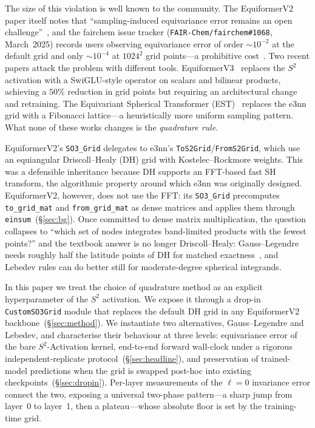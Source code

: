 \documentclass{article}
\begin{document}
The size of this violation is well known to the community. The
EquiformerV2 paper itself notes that ``sampling-induced equivariance
error remains an open challenge''~\cite{equiformerv2}, and the fairchem
issue tracker (\texttt{FAIR-Chem/fairchem\#1068}, March~2025) records
users observing equivariance error of order $\sim 10^{-2}$ at the
default grid and only $\sim 10^{-4}$ at $1024^2$ grid points---a
prohibitive cost~\cite{fairchem1068}. Two recent papers attack the
problem with different tools. EquiformerV3~\cite{equiformerv3}
replaces the $S^2$ activation with a SwiGLU-style operator on scalars
and bilinear products, achieving a $50\%$ reduction in grid points but
requiring an architectural change and retraining. The Equivariant
Spherical Transformer (EST)~\cite{est} replaces the e3nn grid with a
Fibonacci lattice---a heuristically more uniform sampling pattern.
What none of these works changes is the \emph{quadrature rule}.

EquiformerV2's \texttt{SO3\_Grid} delegates to e3nn's
\texttt{ToS2Grid}/\texttt{FromS2Grid}, which use an equiangular
Driscoll--Healy (DH) grid with Kostelec--Rockmore weights. This was a
defensible inheritance because DH supports an FFT-based fast SH
transform, the algorithmic property around which e3nn was originally
designed. EquiformerV2, however, does not use the FFT: its
\texttt{SO3\_Grid} precomputes \texttt{to\_grid\_mat} and
\texttt{from\_grid\_mat} as dense matrices and applies them through
\texttt{einsum}~(\S\ref{sec:bg}). Once committed to dense matrix
multiplication, the question collapses to ``which set of nodes
integrates band-limited products with the fewest points?'' and the
textbook answer is no longer Driscoll--Healy: Gauss--Legendre needs
roughly half the latitude points of DH for matched
exactness~\cite{shtools,glq_dh_planet,driscoll_healy}, and Lebedev
rules can do better still for moderate-degree spherical integrands.

In this paper we treat the choice of quadrature method as an explicit
hyperparameter of the $S^2$ activation. We expose it through a drop-in
\texttt{CustomSO3Grid} module that replaces the default DH grid in
any EquiformerV2 backbone~(\S\ref{sec:method}). We instantiate two
alternatives, Gauss--Legendre and Lebedev, and characterise their
behaviour at three levels: equivariance error of the bare
$S^2$-Activation kernel, end-to-end forward wall-clock under a
rigorous independent-replicate protocol~(\S\ref{sec:headline}), and
preservation of trained-model predictions when the grid is swapped
post-hoc into existing checkpoints~(\S\ref{sec:dropin}). Per-layer
measurements of the $\ell{=}0$ invariance error connect the two,
exposing a universal two-phase pattern---a sharp jump from layer~0
to layer~1, then a plateau---whose absolute floor is set by the
training-time grid.
\end{document}
